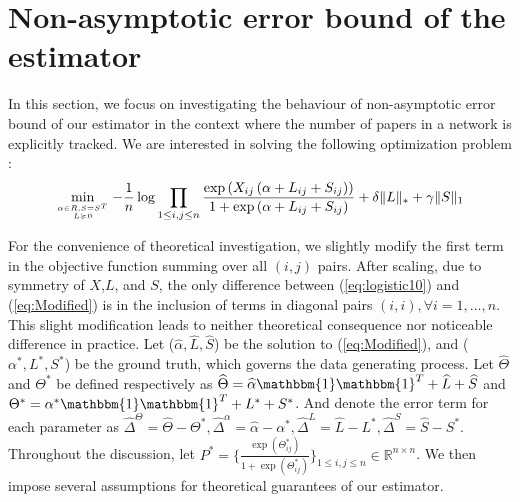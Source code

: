 \documentclass[AMS,STIX1COL]{WileyNJD-v2}
\begin{document}
{\section{Non-asymptotic error bound of the estimator}
\label{sec:theorem}
In this section, we focus on investigating the behaviour of non-asymptotic error bound of our estimator in the context where the number of papers in a network is explicitly tracked. We are interested in solving the following optimization problem :
\begin{equation}\label{eq:Modified}
\min\limits_{\alpha \in R, S = S^T \atop L \succcurlyeq 0}
-\frac{1}{n} \log \prod_{1\le i,j\le n}\frac{\exp\left(X_{ij}\left(\alpha+
L_{ij}+S_{ij}\right)\right)}{1+\exp\left(\alpha+
L_{ij}+S_{ij}\right)} + \delta \|L\|_\ast + \gamma \|S\|_1
\end{equation}

For the convenience of theoretical investigation, we slightly modify the first term in the objective function summing over all $(i,j)$ pairs.
After scaling, due to symmetry of $X$,$L$, and $S$, the only difference between (\ref{eq:logistic10}) and (\ref{eq:Modified}) is in the inclusion of terms in diagonal pairs $(i,i),\forall i=1,\dots,n$.
This slight modification leads to neither theoretical consequence nor noticeable difference in practice.
Let ($\widehat{\alpha},\widehat{L},\widehat{S}$) be the solution to (\ref{eq:Modified}), and ($\alpha^{*},L^{*},S^{*}$) be the ground truth, which governs the data generating process.
Let $\widehat{\Theta}$ and $\Theta^{*}$ be defined respectively as $\widehat{\Theta} = \widehat{\alpha}\mathbbm{1}\mathbbm{1}^T+\widehat{L}+\widehat{S}$ and $\Theta^{*} = \alpha^{*}\mathbbm{1}\mathbbm{1}^T+L^{*}+S^{*}$.
And denote the error term for each parameter as $\widehat{\Delta}^{\Theta} = \widehat{\Theta}-\Theta^{*},
\widehat{\Delta}^{\alpha} = \widehat{\alpha}-\alpha^{*},
\widehat{\Delta}^L = \widehat{L}-L^{*},
\widehat{\Delta}^S = \widehat{S}-S^{*}.$
Throughout the discussion, let $P^{*}=\big\{\frac{\exp(\Theta_{ij}^{*})}{1+\exp(\Theta_{ij}^{*})}\big\}_{1 \leq i,j \leq n} \in \mathbb{R}^{n \times n}$.
We then impose several assumptions for theoretical guarantees of our estimator.

}
\end{document}
